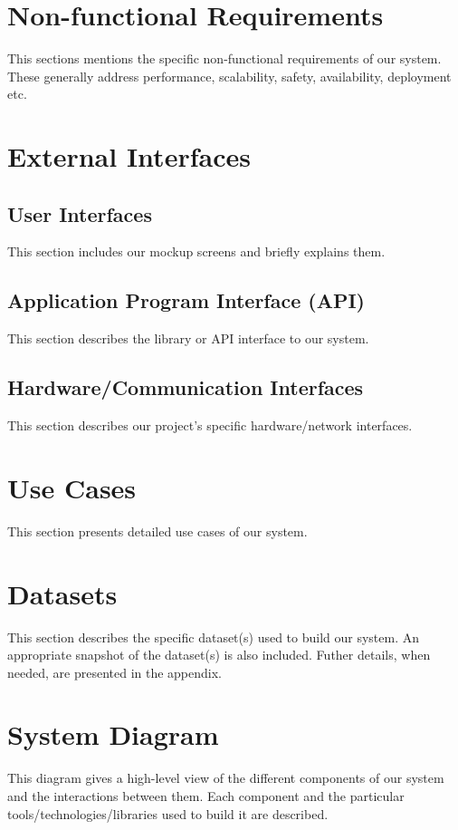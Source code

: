 
\section{Non-functional Requirements}

This sections mentions the specific non-functional requirements of our system. These generally address performance, scalability, safety, availability, deployment etc.

\section{External Interfaces}

\subsection{User Interfaces}
This section includes our mockup screens and briefly explains them.

\subsection{Application Program Interface (API)}
This section describes the library or API interface to our system.

\subsection{Hardware/Communication Interfaces}
This section describes our project's specific hardware/network interfaces.

\section{Use Cases}
This section presents detailed use cases of our system.

\section{Datasets}
This section describes the specific dataset(s) used to build our system. An appropriate snapshot of the dataset(s) is also included. Futher details, when needed, are presented in the appendix.

\section{System Diagram}
This diagram gives a high-level view of the different components of our system and the interactions between them. Each component and the particular tools/technologies/libraries used to build it are described.
